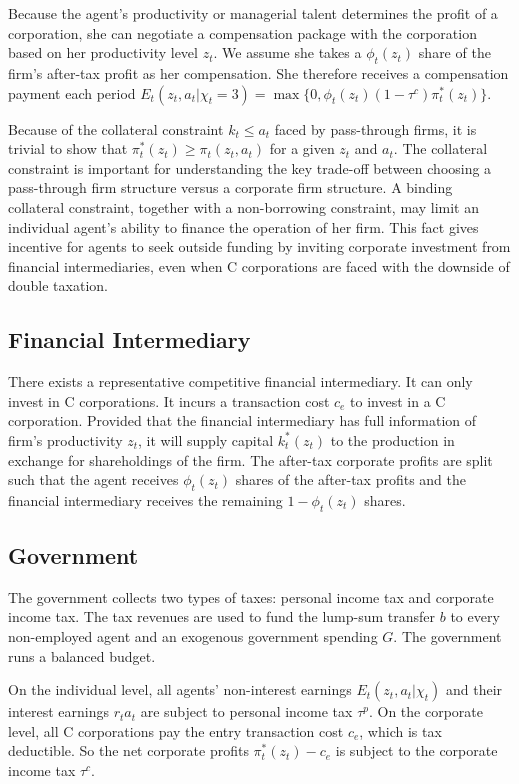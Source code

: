 \documentclass[12pt]{article}
\begin{document}
Because the agent's productivity or managerial talent determines the profit
of a corporation, she can negotiate a compensation package with the
corporation based on her productivity level $z_t$. We assume she takes a $%
\phi_t(z_t)$ share of the firm's after-tax profit as her compensation. She
therefore receives a compensation payment each period $E_t(z_t,a_t|\chi_t=3)=\max\{0,\phi_t(z_t)(1-%
\tau^c)\pi_t^*(z_t)\}$.

Because of the collateral constraint $k_t\leq a_t$ faced by pass-through
firms, it is trivial to show that $\pi_t^*(z_t)\geq \pi_t(z_t,a_t)$ for a given $%
z_t$ and $a_t$. The collateral constraint is important for understanding the
key trade-off between choosing a pass-through firm structure versus a
corporate firm structure. A binding collateral constraint, together with a
non-borrowing constraint, may limit an individual agent's ability to finance
the operation of her firm. This fact gives incentive for agents to seek
outside funding by inviting corporate investment from financial
intermediaries, even when C corporations are faced with the downside of
double taxation.

\subsection{Financial Intermediary}
There exists a representative competitive financial intermediary. It can only invest in C corporations. It incurs a transaction cost $c_e$ to invest in a C corporation. Provided that the financial intermediary has full information of firm's productivity $z_t$, it will supply capital $k^*_t(z_t)$ to the production in exchange for shareholdings of the firm. The after-tax corporate profits are split such that the agent receives $\phi_t(z_t)$ shares of the after-tax profits and the financial intermediary receives the remaining $1-\phi_t(z_t)$ shares. 

\subsection{Government}
The government collects two types of taxes: personal income tax and corporate income tax. The tax revenues are used to fund the lump-sum transfer $b$ to every non-employed agent and an exogenous government spending $G$. The government runs a balanced budget.

On the individual level, all agents' non-interest earnings $E_t(z_t,a_t|\chi_t)$ and
their interest earnings $r_ta_t$ are subject to personal income tax $\tau^p$. On the corporate level, all C corporations pay the entry transaction cost $c_e$, which is tax deductible. So the net corporate profits $\pi^*_t(z_t)-c_e$ is subject to the corporate income tax $\tau^c$.
\end{document}
